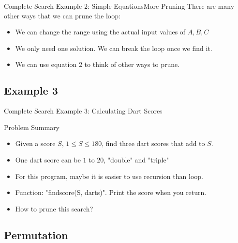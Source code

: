\begin{frame}{Complete Search Example 2: Simple Equations}{More Pruning}
  There are many other ways that we can prune the loop:

  \medskip

  \begin{itemize}
  \item We can change the range using the actual input values of $A,B,C$
  \item We only need one solution. We can break the loop once we find it.
  \item We can use equation 2 to think of other ways to prune.
  \end{itemize}

  \vfill

\end{frame}

\subsection{Example 3}
\begin{frame}{Complete Search Example 3: Calculating Dart Scores}
  \begin{block}{Problem Summary}
    \begin{itemize}
      \item Given a score $S$, $1\leq S \leq 180$, find three dart scores that add to $S$.
      \item One dart score can be $1$ to $20$, "double" and "triple"
    \end{itemize}
  \end{block}
  \vfill

  \begin{itemize}
    \item For this program, maybe it is easier to use recursion than loop.
    \item Function: "findscore(S, darts)". Print the score when you return.
    \item How to prune this search?
  \end{itemize}
\end{frame}

\subsection{Permutation}

